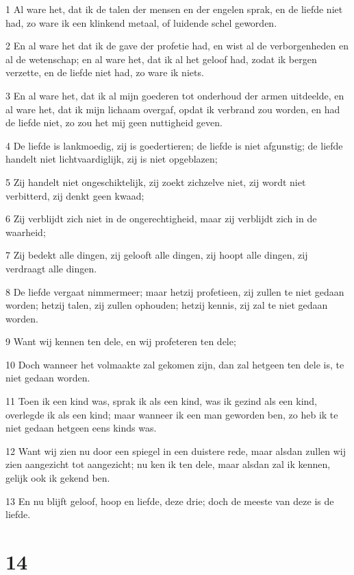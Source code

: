 \par 1 Al ware het, dat ik de talen der mensen en der engelen sprak, en de liefde niet had, zo ware ik een klinkend metaal, of luidende schel geworden.
\par 2 En al ware het dat ik de gave der profetie had, en wist al de verborgenheden en al de wetenschap; en al ware het, dat ik al het geloof had, zodat ik bergen verzette, en de liefde niet had, zo ware ik niets.
\par 3 En al ware het, dat ik al mijn goederen tot onderhoud der armen uitdeelde, en al ware het, dat ik mijn lichaam overgaf, opdat ik verbrand zou worden, en had de liefde niet, zo zou het mij geen nuttigheid geven.
\par 4 De liefde is lankmoedig, zij is goedertieren; de liefde is niet afgunstig; de liefde handelt niet lichtvaardiglijk, zij is niet opgeblazen;
\par 5 Zij handelt niet ongeschiktelijk, zij zoekt zichzelve niet, zij wordt niet verbitterd, zij denkt geen kwaad;
\par 6 Zij verblijdt zich niet in de ongerechtigheid, maar zij verblijdt zich in de waarheid;
\par 7 Zij bedekt alle dingen, zij gelooft alle dingen, zij hoopt alle dingen, zij verdraagt alle dingen.
\par 8 De liefde vergaat nimmermeer; maar hetzij profetieen, zij zullen te niet gedaan worden; hetzij talen, zij zullen ophouden; hetzij kennis, zij zal te niet gedaan worden.
\par 9 Want wij kennen ten dele, en wij profeteren ten dele;
\par 10 Doch wanneer het volmaakte zal gekomen zijn, dan zal hetgeen ten dele is, te niet gedaan worden.
\par 11 Toen ik een kind was, sprak ik als een kind, was ik gezind als een kind, overlegde ik als een kind; maar wanneer ik een man geworden ben, zo heb ik te niet gedaan hetgeen eens kinds was.
\par 12 Want wij zien nu door een spiegel in een duistere rede, maar alsdan zullen wij zien aangezicht tot aangezicht; nu ken ik ten dele, maar alsdan zal ik kennen, gelijk ook ik gekend ben.
\par 13 En nu blijft geloof, hoop en liefde, deze drie; doch de meeste van deze is de liefde.

\chapter{14}

